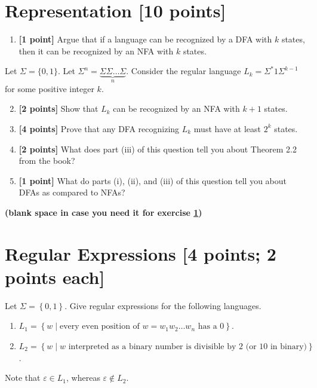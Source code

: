 \documentclass[letterpaper,11pt,twoside]{article}
\providecommand{\set}[1]{\ensuremath{\left\{#1\right\}}\xspace}
\providecommand{\emptystring}{\ensuremath{\varepsilon}\xspace}
\begin{document}
\newpage
\section{Representation [10 points]}\label{repr}
\begin{enumerate}[label=(\roman*)]
\item \textbf{[1 point]} Argue that if a language can be recognized by a DFA with $k$ states, then it can be recognized by an NFA with $k$ states.
\end{enumerate}
Let $\Sigma = \{0, 1\}$.
Let $\Sigma^n = \underbrace{\Sigma\Sigma\ldots\Sigma}_{n}$.
Consider the regular language $L_k = \Sigma^*1\Sigma^{k-1}$ for some positive integer $k$.
\begin{enumerate}[label=(\roman*)]\setcounter{enumi}{1}
\item \textbf{[2 points]} Show that $L_k$ can be recognized by an NFA with $k+1$ states.
\item \textbf{[4 points]} Prove that any DFA recognizing $L_k$ must have at least $2^k$ states.
\item \textbf{[2 points]} What does part (iii) of this question tell you about Theorem 2.2 from the book?
\item \textbf{[1 point]} What do parts (i), (ii), and (iii) of this question tell you about DFAs as compared to NFAs? 
\end{enumerate}


\newpage
\begin{center}
\textbf{(blank space in case you need it for exercise \ref{repr})}
\end{center}



\newpage
\section{Regular Expressions [4 points; 2 points each]}
Let $\Sigma = \set{0, 1}$. Give regular expressions for the following languages.
\begin{enumerate}[label=(\roman*)]
\item $L_1 = \set{w \mid \mbox{every even position of $w = w_1w_2\ldots w_n$ has a 0}}$.
\item $L_2 = \set{w \mid \mbox{$w$ interpreted as a binary number is divisible by 2 (or 10 in binary)}}$.
\end{enumerate}
Note that $\emptystring\in L_1$, whereas $\emptystring\not\in L_2$.


\newpage
\end{document}
